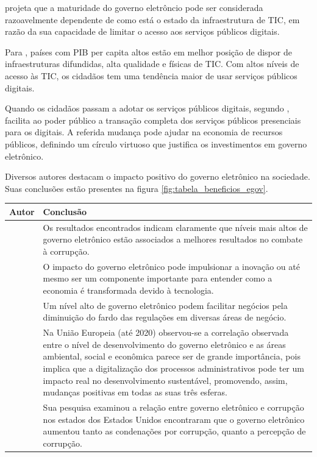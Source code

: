 \cite{singh2007country} projeta que a maturidade do governo eletrôncio pode ser considerada razoavelmente dependente de como está o estado da infraestrutura de TIC, em razão da sua capacidade de limitar o acesso aos serviços públicos digitais. 

Para \cite{singh2007country}, países com PIB per capita altos estão em melhor posição de dispor de infraestruturas difundidas, alta qualidade e físicas de TIC. Com altos níveis de acesso às TIC, os cidadãos tem uma tendência maior de usar serviços públicos digitais.

Quando os cidadãos passam a adotar os serviços públicos digitais, segundo \cite{singh2007country}, facilita ao poder público a transação completa dos serviços públicos presenciais para os digitais. A referida mudança pode ajudar na economia de recursos públicos, definindo um círculo virtuoso que justifica os investimentos em governo eletrônico.

Diversos autores destacam o impacto positivo do governo eletrônico na sociedade. Suas conclusões estão presentes na figura \ref{fig:tabela_beneficios_egov}.

\begin{table}[]
\begin{tabular}{@{}ll@{}}
\toprule
Autor &
  Conclusão \\ \midrule
\cite{martins2018war} &
  Os resultados encontrados indicam claramente que níveis mais altos de   governo eletrônico estão associados a melhores resultados no combate à   corrupção. \\
\cite{kotenok2020government} &
  O impacto do governo eletrônico pode impulsionar a inovação ou até mesmo   ser um componente importante para entender como a economia é transformada   devido à tecnologia. \\
\cite{martins2022digital} &
  Um nível alto de governo eletrônico podem facilitar negócios pela   diminuição do fardo das regulações em diversas áreas de negócio. \\ \midrule
\cite{ziolo2022government} &
  Na União Europeia (até 2020) observou-se a correlação observada entre o   nível de desenvolvimento do governo eletrônico e as áreas ambiental, social e   econômica parece ser de grande importância, pois implica que a digitalização   dos processos administrativos pode ter um impacto real no desenvolvimento   sustentável, promovendo, assim, mudanças positivas em todas as suas três   esferas. \\
\cite{sugiarti2024effect} &
  Sua pesquisa examinou a relação entre governo eletrônico e corrupção nos   estados dos Estados Unidos encontraram que o governo eletrônico aumentou   tanto as condenações por corrupção, quanto a percepção de corrupção.
\end{tabular}
\end{table}

